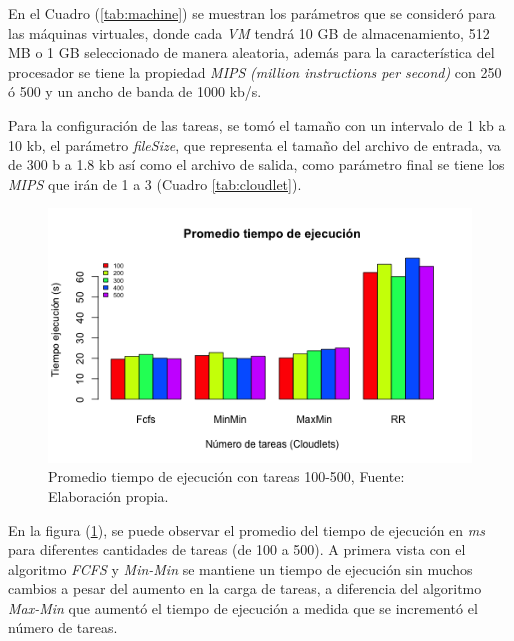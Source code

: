En el Cuadro (\ref{tab:machine}) se muestran los par\'ametros que se consider\'o para las m\'aquinas virtuales, donde cada \textit{VM} tendr\'a 10 GB de almacenamiento, 512 MB  o 1 GB seleccionado de manera aleatoria, adem\'as para la caracter\'istica del procesador se tiene  la propiedad \textit{MIPS} \textit{(million instructions per second)} con 250 \'o 500 y un ancho de banda de 1000 kb/s.

Para la configuraci\'on de las tareas, se tom\'o el tamaño con un intervalo de 1 kb a 10 kb,  el par\'ametro \textit{fileSize}, que representa el tamaño del archivo de entrada, va de 300 b a 1.8 kb as\'i como el archivo de salida, como par\'ametro final se tiene los \textit{MIPS} que ir\'an de 1 a 3 (Cuadro \ref{tab:cloudlet}).



\newpage

\setcounter{figure}{17}
\renewcommand\thefigure{\arabic{figure}}
\begin{figure}[h!] 
	\centering
	\includegraphics[scale=0.5]{media/tiempoejecucion}
	\caption{Promedio tiempo de ejecuci\'on con tareas 100-500, Fuente: Elaboraci\'on propia.}
	\label{fig:tiempo}
\end{figure}



En la figura (\ref{fig:tiempo}), se puede observar el promedio del tiempo de ejecuci\'on en \emph{ms} para diferentes cantidades de tareas (de 100 a 500). A primera vista con el algoritmo \textit{FCFS} y \textit{Min-Min} se mantiene un tiempo de ejecuci\'on sin muchos cambios a pesar del aumento en la carga de tareas, a diferencia del algoritmo \textit{Max-Min} que aument\'o el tiempo de ejecuci\'on a medida que se increment\'o el n\'umero de tareas.

\label{etiqueta}
\newpage

